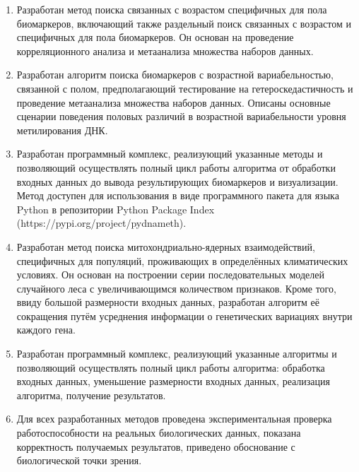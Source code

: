 \begin{enumerate}
  \item Разработан метод поиска связанных с возрастом специфичных для пола биомаркеров, включающий также раздельный поиск связанных с возрастом и специфичных для пола биомаркеров. Он основан на проведение корреляционного анализа и метаанализа множества наборов данных.
  \item Разработан алгоритм поиска биомаркеров с возрастной вариабельностью, связанной с полом, предполагающий тестирование на гетероскедастичность и проведение метаанализа множества наборов данных. Описаны основные сценарии поведения половых различий в возрастной вариабельности уровня метилирования ДНК.
  \item Разработан программный комплекс, реализующий указанные методы и позволяющий осуществлять полный цикл работы алгоритма от обработки входных данных до вывода результирующих биомаркеров и визуализации. Метод доступен для использования в виде программного пакета для языка Python в репозитории Python Package Index (https://pypi.org/project/pydnameth).
  \item Разработан метод поиска митохондриально-ядерных взаимодействий, специфичных для популяций, проживающих в определённых климатических условиях. Он основан на построении серии последовательных моделей случайного леса с увеличивающимся количеством признаков. Кроме того, ввиду большой размерности входных данных, разработан алгоритм её сокращения путём усреднения информации о генетических вариациях внутри каждого гена.
  \item Разработан программный комплекс, реализующий указанные алгоритмы и позволяющий осуществлять полный цикл работы алгоритма: обработка входных данных, уменьшение размерности входных данных, реализация алгоритма, получение результатов.
  \item Для всех разработанных методов проведена экспериментальная проверка работоспособности на реальных биологических данных, показана корректность получаемых результатов, приведено обоснование с биологической точки зрения.
\end{enumerate}

